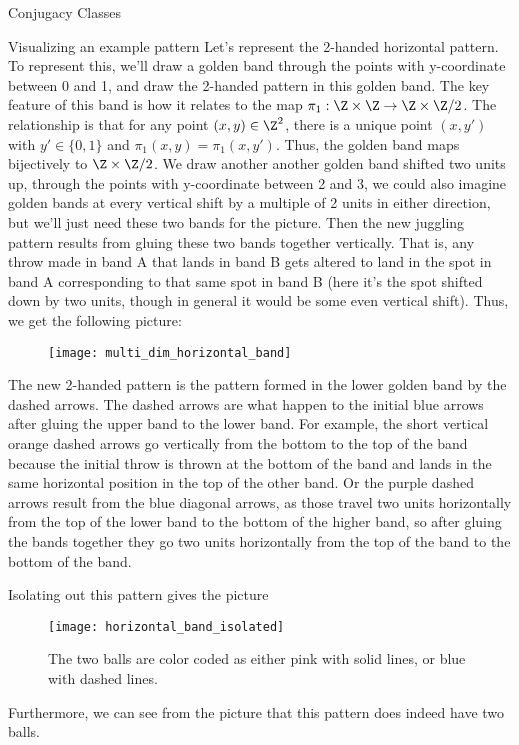 \documentclass[12nt]{article}
\theoremstyle{plain}
\begin{document}
\begin{subsection}{Conjugacy Classes}
\begin{subsection}{Visualizing an example pattern}
Let's represent the 2-handed horizontal pattern. To represent this, we'll draw a golden band through the points with y-coordinate between 0 and 1, and draw the 2-handed pattern in this golden band. The key feature of this band is how it relates to the map $\pi_1 : \Z \times \Z \to \Z \times \Z/2$. The relationship is that for any point $(x, y) \in \Z^2$, there is a unique point $(x, y')$ with $y' \in \{0, 1\}$ and $\pi_1(x, y) = \pi_1(x, y')$. Thus, the golden band maps bijectively to $\Z \times \Z/2$. We draw another another golden band shifted two units up, through the points with y-coordinate between 2 and 3, we could also imagine golden bands at every vertical shift by a multiple of 2 units in either direction, but we'll just need these two bands for the picture. Then the new juggling pattern results from gluing these two bands together vertically. That is, any throw made in band A that lands in band B gets altered to land in the spot in band A corresponding to that same spot in band B (here it's the spot shifted down by two units, though in general it would be some even vertical shift). Thus, we get the following picture:

\begin{figure}[h]
\texttt{[image: multi\_dim\_horizontal\_band]}
\end{figure}

The new 2-handed pattern is the pattern formed in the lower golden band by the dashed arrows. The dashed arrows are what happen to the initial blue arrows after gluing the upper band to the lower band. For example, the short vertical orange dashed arrows go vertically from the bottom to the top of the band because the initial throw is thrown at the bottom of the band and lands in the same horizontal position in the top of the other band. Or the purple dashed arrows result from the blue diagonal arrows, as those travel two units horizontally from the top of the lower band to the bottom of the higher band, so after gluing the bands together they go two units horizontally from the top of the band to the bottom of the band. 

Isolating out this pattern gives the picture

\begin{figure}[h]
\texttt{[image: horizontal\_band\_isolated]}
\caption{The two balls are color coded as either pink with solid lines, or blue with dashed lines.}
\end{figure}

Furthermore, we can see from the picture that this pattern does indeed have two balls.


\end{subsection}
\end{subsection}
\end{document}
